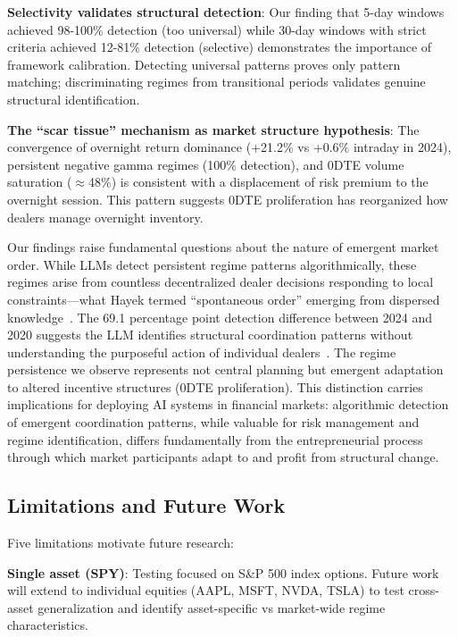 \textbf{Selectivity validates structural detection}: Our finding that 5-day windows achieved 98-100\% detection (too universal) while 30-day windows with strict criteria achieved 12-81\% detection (selective) demonstrates the importance of framework calibration. Detecting universal patterns proves only pattern matching; discriminating regimes from transitional periods validates genuine structural identification.

\textbf{The ``scar tissue'' mechanism as market structure hypothesis}: The convergence of overnight return dominance (+21.2\% vs +0.6\% intraday in 2024), persistent negative gamma regimes (100\% detection), and 0DTE volume saturation ($\approx$48\%) is consistent with a displacement of risk premium to the overnight session. This pattern suggests 0DTE proliferation has reorganized how dealers manage overnight inventory.

Our findings raise fundamental questions about the nature of emergent market order. While LLMs detect persistent regime patterns algorithmically, these regimes arise from countless decentralized dealer decisions responding to local constraints—what Hayek termed ``spontaneous order'' emerging from dispersed knowledge~\citep{hayek1945}. The 69.1 percentage point detection difference between 2024 and 2020 suggests the LLM identifies structural coordination patterns without understanding the purposeful action of individual dealers~\citep{mises1949,rothbard1962}. The regime persistence we observe represents not central planning but emergent adaptation to altered incentive structures (0DTE proliferation). This distinction carries implications for deploying AI systems in financial markets: algorithmic detection of emergent coordination patterns, while valuable for risk management and regime identification, differs fundamentally from the entrepreneurial process through which market participants adapt to and profit from structural change.

\subsection{Limitations and Future Work}

Five limitations motivate future research:

\textbf{Single asset (SPY)}: Testing focused on S\&P 500 index options. Future work will extend to individual equities (AAPL, MSFT, NVDA, TSLA) to test cross-asset generalization and identify asset-specific vs market-wide regime characteristics.

